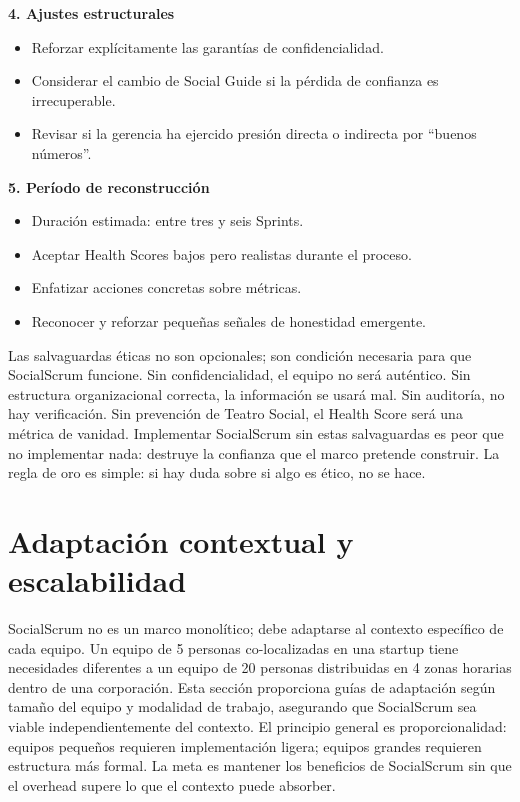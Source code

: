 \begin{protocolo}
    \textbf{4. Ajustes estructurales}
    \begin{itemize}
        \item Reforzar explícitamente las garantías de confidencialidad.
        \item Considerar el cambio de Social Guide si la pérdida de confianza es irrecuperable.
        \item Revisar si la gerencia ha ejercido presión directa o indirecta por “buenos números”.
    \end{itemize}

    \textbf{5. Período de reconstrucción}
    \begin{itemize}
        \item Duración estimada: entre tres y seis Sprints.
        \item Aceptar Health Scores bajos pero realistas durante el proceso.
        \item Enfatizar acciones concretas sobre métricas.
        \item Reconocer y reforzar pequeñas señales de honestidad emergente.
    \end{itemize}
\end{protocolo}

Las salvaguardas éticas no son opcionales; son condición necesaria para que SocialScrum funcione. Sin confidencialidad, el equipo no será auténtico. Sin estructura organizacional correcta, la información se usará mal. Sin auditoría, no hay verificación. Sin prevención de Teatro Social, el Health Score será una métrica de vanidad. Implementar SocialScrum sin estas salvaguardas es peor que no implementar nada: destruye la confianza que el marco pretende construir. La regla de oro es simple: si hay duda sobre si algo es ético, no se hace.

\section{Adaptación contextual y escalabilidad}

SocialScrum no es un marco monolítico; debe adaptarse al contexto específico de cada equipo. Un equipo de 5 personas co-localizadas en una startup tiene necesidades diferentes a un equipo de 20 personas distribuidas en 4 zonas horarias dentro de una corporación. Esta sección proporciona guías de adaptación según tamaño del equipo y modalidad de trabajo, asegurando que SocialScrum sea viable independientemente del contexto.
El principio general es proporcionalidad: equipos pequeños requieren implementación ligera; equipos grandes requieren estructura más formal. La meta es mantener los beneficios de SocialScrum sin que el overhead supere lo que el contexto puede absorber.

